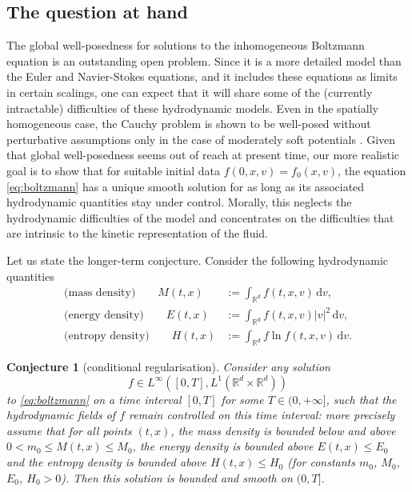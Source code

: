 \documentclass[JEP,XML,SOM,Unicode,NoFloatCountersInSection]{cedram}
\theoremstyle{plain}
\newtheorem*{conj*}{Conjecture}
\theoremstyle{definition}
\numberwithin{equation}{section}
\newcommand{\R}{\mathbb R}
\newcommand{\dd} {\, \mathrm{d}}
\begin{document}
\subsection{The question at hand}

The global well-posedness for solutions to the inhomogeneous Boltzmann
equation is an outstanding open problem. Since it is a more detailed
model than the Euler and Navier-Stokes equations, and it includes
these equations as limits in certain scalings, one can expect that it
will share some of the (currently intractable) difficulties of these
hydrodynamic models. Even in the spatially homogeneous case, the
Cauchy problem is shown to be well-posed without perturbative
assumptions only in the case of moderately soft potentials
\cite{MR2525118}. Given that global well-posedness seems out of reach
at present time, our more realistic goal is to show that for suitable
initial data $f(0,x,v) = f_0(x,v)$, the equation \eqref{eq:boltzmann}
has a unique smooth solution for as long as its associated
hydrodynamic quantities stay under control. Morally, this neglects the
hydrodynamic difficulties of the model and concentrates on the
difficulties that are intrinsic to the kinetic representation of the
fluid.

Let us state the longer-term conjecture. Consider the following
hydrodynamic quantities
\begin{align*}
\text{(mass density)} \qquad M (t,x) &:= \int_{\R^d} f(t,x,v) \dd v, \\
\text{(energy density)} \qquad E (t,x) & := \int_{\R^d} f(t,x,v) |v|^2 \dd v, \\
\text{(entropy density)} \qquad H (t,x) & := \int_{\R^d} f \ln f (t,x,v) \dd v.
\end{align*}

\begin{conj*}[conditional regularisation]
Consider any
solution
\[
f \in L^\infty([0,T],L^1(\R^d \times \R^d))
\]
to \eqref{eq:boltzmann} on a time interval $[0,T]$ for some
$T \in (0,+\infty]$, such that the hydrodynamic fields of $f$ remain
controlled on this time interval: more precisely assume that for all
points $(t,x)$, the mass density is bounded below and above
$0 < m_0 \leq M(t,x) \leq M_0$, the energy density is bounded above
$E(t,x) \leq E_0$ and the entropy density is bounded above
$H(t,x) \leq H_0$ (for constants $m_0$, $M_0$, $E_0$, $H_0>0$). Then
this solution is bounded and smooth on
$(0,T]$.
\end{conj*}
\end{document}

